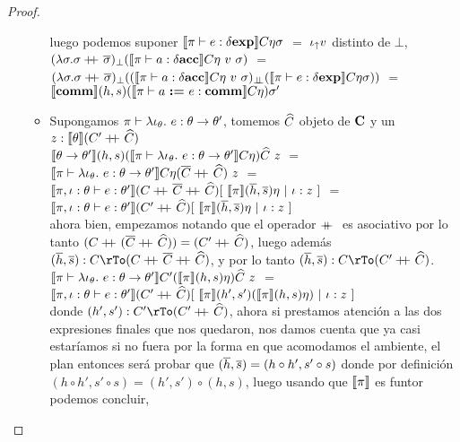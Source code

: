 \begin{proof}
\begin{itemize}
\begin{itemize}
luego podemos suponer $\llbracket \pi \vdash e : \delta \textbf{exp} \rrbracket C \eta \sigma$ $=$ $\iota_{\uparrow} v$ distinto
de $\bot$,\\

$(\lambda \sigma . \sigma \concat \sigmaover)_{\bot}
				(\semBrcks{\pi \vdash a : \deltaacc} C \eta \ v \ \sigma)$ $=$\\
$(\lambda \sigma . \sigma +\kern-1.3ex+\kern0.8ex \overline{\sigma})_{\bot}
	((\llbracket \pi \vdash a : \delta \textbf{acc} \rrbracket C \eta \ v \ \sigma)_{\bot \!\!\! \bot}
			(\llbracket \pi \vdash e : \delta \textbf{exp} \rrbracket C \eta \sigma))$ $=$\\
$\llbracket \textbf{comm} \rrbracket(h,s)(\llbracket \pi \vdash a \ \textbf{:=} \ e : \textbf{comm} \rrbracket C\eta)\sigma'$\\

\item Supongamos $\pi \vdash \lambda \iota_{\theta} . \ e : \theta \rightarrow \theta'$, tomemos
$\widehat{C}$ objeto de $\textbf{C}$ y un $z : \llbracket \theta \rrbracket(C'+\kern-1.3ex+\kern0.8ex\widehat{C})$ \\

$\llbracket \theta \rightarrow \theta' \rrbracket(h,s)
(\llbracket \pi \vdash 
	\lambda \iota_{\theta} . \ e : \theta \rightarrow \theta' \rrbracket C \eta)\widehat{C} \ z$ $=$\\
$\llbracket \pi \vdash \lambda \iota_{\theta} . \ e : \theta \rightarrow \theta' \rrbracket C 
	\eta (\overline{C} +\kern-1.3ex+\kern0.8ex \widehat{C}) \ z$ $=$\\
$\llbracket \pi,\iota:\theta \vdash e : \theta' \rrbracket
	(C +\kern-1.3ex+\kern0.8ex \overline{C} +\kern-1.3ex+\kern0.8ex \widehat{C})
	[ \ \llbracket \pi \rrbracket(\overline{h},\overline{s})\eta \ | \ \iota:z \ ]$ $=$\\
$\semBrcks{\pi,\iota:\theta \vdash e : \theta'}
	(C' \concat \Chat)
	[ \ \semBrcks{\pi}(\hover,\sover)\eta \ | \ \iota:z \ ]$ \\

ahora bien, empezamos notando que el operador $+\kern-1.3ex+\kern0.8ex$ es asociativo por lo tanto
$(C +\kern-1.3ex+\kern0.8ex (\overline{C} +\kern-1.3ex+\kern0.8ex \widehat{C})) = (C' +\kern-1.3ex+\kern0.8ex \widehat{C})$, luego adem\'as
$(\hover,\sover) : C \rTo (C \concat \Cover \concat \Chat)$, y por lo tanto
$(\hover,\sover) : C \rTo (C' \concat \Chat)$.\\

$\llbracket \pi \vdash \lambda \iota_{\theta} . \ e : \theta \rightarrow \theta' \rrbracket
		C'(\llbracket \pi \rrbracket(h,s)\eta)\widehat{C} \ z$ $=$\\
$\semBrcks{\pi,\iota:\theta \vdash e : \theta'}(C' \concat \Chat)
			[ \ \semBrcks{\pi}(h',s')(\semBrcks{\pi}(h,s)\eta) \ | \ \iota:z \ ]$\\

donde $(h',s') : C' \rTo (C' \concat \Chat)$,
ahora si prestamos atenci\'on a las dos expresiones finales que nos quedaron, nos 
damos cuenta que ya casi estar\'iamos si no fuera por la forma en que acomodamos
el ambiente, el plan entonces ser\'a probar que $(\overline{h},\overline{s}) = (h \circ h',s'\circ s)$
donde por definici\'on $(h \circ h',s'\circ s) = (h',s') \circ (h,s)$, luego usando
que $\llbracket \pi \rrbracket$ es funtor podemos concluir,


\end{itemize}
\end{itemize}
\end{proof}
